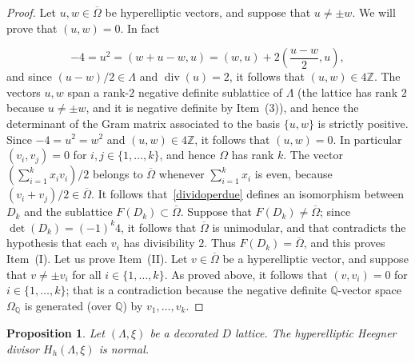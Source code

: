 \documentclass[11pt]{amsart}
\numberwithin{equation}{subsection}
\theoremstyle{plain}
\newtheorem{proposition}[theorem]{Proposition}
\theoremstyle{remark}
\theoremstyle{definition}
\newcommand{\ov}{\overline}
\newcommand{\QQ}{{\mathbb Q}}
\newcommand{\ZZ}{{\mathbb Z}}
\DeclareMathOperator{\divisore}{div}
\begin{document}
\begin{proof}
%
Let $u,w\in\ov{\Omega}$ be  hyperelliptic vectors, and suppose that $u\not=\pm w$. We will prove that $(u,w)=0$. In fact

 $$-4=u^2=(w+u-w,u)=(w,u)+2\left(\frac{u-w}{2},u\right),$$
 and since $(u-w)/2\in\Lambda$ and $\divisore(u)=2$, it follows that
  $(u,w)\in 4\ZZ$.  The vectors $u,w$ span a rank-$2$ negative definite sublattice of $\Lambda$ (the lattice has rank  $2$ because  $u\not=\pm w$, and it is negative definite by Item~(3)), and hence the determinant of the Gram matrix associated to the basis $\{u,w\}$ is strictly positive. Since $-4=u^2=w^2$ and $(u,w)\in 4\ZZ$, it follows that $(u,w)=0$. 
In particular  $(v_i,v_j)=0$  for  $i,j\in\{1,\ldots,k\}$, and hence $\Omega$ has rank $k$. The vector  $(\sum_{i=1}^k x_i v_i)/2$ belongs to $\ov{\Omega}$ whenever $\sum_{i=1}^k x_i$ is even, because $(v_i+v_j)/2\in\ov{\Omega}$.  It   follows that~\eqref{dividoperdue} defines an isomorphism between $D_k$ and the sublattice  $F(D_k)\subset\ov{\Omega}$. Suppose that $F(D_k)\not=\ov{\Omega}$; since $\det(D_k)=(-1)^k 4$, it follows that $\ov{\Omega}$ is unimodular, and that contradicts the hypothesis that each $v_i$ has divisibility $2$. Thus  $F(D_k)=\ov{\Omega}$, and this proves Item~(I).
 Let us prove  Item~(II).
Let $v\in\ov{\Omega}$   be a  hyperelliptic vector, and suppose that  $v\not=\pm v_i$ for all $i\in\{1,\ldots,k\}$. As proved above, it follows that $(v,v_i)=0$ for  $i\in\{1,\ldots,k\}$; that is a contradiction because the negative definite $\QQ$-vector space  $\Omega_{\QQ}$ is  generated (over $\QQ$)   by $v_1,\ldots,v_k$.
%
\end{proof}
%
%
\begin{proposition}\label{prp:manyhyp}
%
Let $(\Lambda,\xi)$ be a decorated $D$ lattice.
The hyperelliptic  Heegner divisor $H_h(\Lambda,\xi)$  is normal. 
%
\end{proposition}
%
\end{document}
